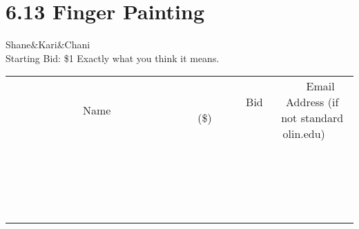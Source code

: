 \documentclass[11pt]{article}
\begin{document}
\section*{6.13 Finger Painting}
Shane\&Kari\&Chani
\\
Starting Bid: \$1
\newline
Exactly what you think it means.
\\[3ex]
\begin{tabular}{c c c}
~~~~~~~~~~~~~Name~~~~~~~~~~~~~ & ~~~~~~~~~Bid (\$)~~~~~~~~~  & ~~~Email Address (if not standard olin.edu)~~~\\
 & & \\
\hline
 & & \\
\hline
 & & \\
\hline
 & & \\
\hline
 & & \\
\hline
 & & \\
\hline
 & & \\
\hline
 & & \\
\hline
 & & \\
\hline
 & & \\
\hline
 & & \\
\hline
 & & \\
\hline
 & & \\
\hline
 & & \\
\hline
 & & \\
\hline
 & & \\
\hline
 & & \\
\hline
 & & \\
\hline
 & & \\
\hline
\end{tabular}
\newpage
\end{document}
